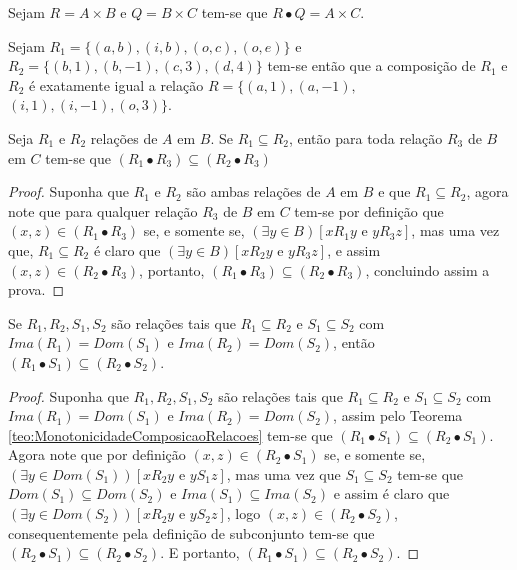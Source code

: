 \begin{exem}
	Sejam $R = A \times B$ e $Q = B \times C$ tem-se que $R \bullet Q = A \times C$.
\end{exem}

\begin{exem}
	Sejam $R_1 = \{(a, b), (i, b), (o, c), (o, e)\}$ e $R_2 = \{(b, 1), (b, -1), (c, 3), (d, 4)\}$ tem-se então que a composição de $R_1$ e $R_2$ é exatamente igual a relação $R = \{(a, 1), (a, -1),$ $(i, 1), (i, -1), (o, 3)\}$.
\end{exem}

\begin{theorem}\label{teo:MonotonicidadeComposicaoRelacoes}
	Seja $R_1$ e $R_2$ relações de $A$ em $B$. Se $R_1 \subseteq R_2$, então para toda relação $R_3$ de $B$ em $C$ tem-se que $(R_1 \bullet R_3) \subseteq (R_2 \bullet R_3)$
\end{theorem}

\begin{proof}
	Suponha que $R_1$ e $R_2$ são ambas relações de $A$ em $B$ e que $R_1 \subseteq R_2$, agora note que para qualquer relação $R_3$ de $B$ em $C$ tem-se por definição que $(x, z) \in (R_1 \bullet R_3)$ se, e somente se, $(\exists y \in B)[x\mathrel{R_1}y \text{ e } y\mathrel{R_3}z]$, mas uma vez que, $R_1 \subseteq R_2$ é claro que $ (\exists y \in B)[x \mathrel{R_2}y \text{ e } y\mathrel{R_3}z]$, e assim $(x, z) \in (R_2 \bullet R_3)$, portanto, $(R_1 \bullet R_3) \subseteq (R_2 \bullet R_3)$, concluindo assim a prova.
\end{proof}

\begin{corollary}\label{col:MonotonicidadeComposicaoRelacoes}
	Se $R_1, R_2, S_1, S_2$ são relações tais que $R_1 \subseteq R_2$ e $S_1 \subseteq S_2$ com $Ima(R_1) = Dom(S_1)$ e $Ima(R_2) = Dom(S_2)$, então $(R_1 \bullet S_1) \subseteq (R_2 \bullet S_2)$.
\end{corollary}

\begin{proof}
	Suponha que $R_1, R_2, S_1, S_2$ são relações tais que $R_1 \subseteq R_2$ e $S_1 \subseteq S_2$ com $Ima(R_1) = Dom(S_1)$ e $Ima(R_2) = Dom(S_2)$, assim pelo Teorema \ref{teo:MonotonicidadeComposicaoRelacoes} tem-se que $(R_1 \bullet S_1) \subseteq (R_2 \bullet S_1)$. Agora note que por definição $(x, z) \in (R_2 \bullet S_1)$ se, e somente se, $(\exists y \in Dom(S_1))[x\mathrel{R_2}y \text{ e } y\mathrel{S_1}z]$, mas uma vez que $S_1 \subseteq S_2$ tem-se que $Dom(S_1) \subseteq Dom(S_2)$ e $Ima(S_1) \subseteq Ima(S_2)$ e assim é claro que $(\exists y \in Dom(S_2))[x\mathrel{R_2}y \text{ e } y\mathrel{S_2}z]$, logo $(x, z) \in (R_2 \bullet S_2)$, consequentemente pela definição de subconjunto tem-se que $(R_2 \bullet S_1) \subseteq (R_2 \bullet S_2)$. E portanto, $(R_1 \bullet S_1) \subseteq (R_2 \bullet S_2)$.
\end{proof}


